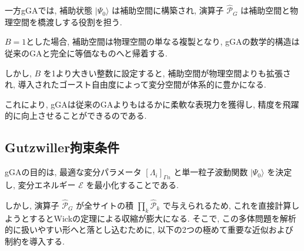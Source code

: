 一方gGAでは, 補助状態 $|\Psi_0\rangle$ は補助空間に構築され, 演算子 $\hat{\mathcal{P}}_G$ は補助空間と物理空間を橋渡しする役割を担う. 

$B=1$とした場合, 補助空間は物理空間の単なる複製となり, gGAの数学的構造は従来のGAと完全に等価なものへと帰着する. 

しかし, $B$ を1より大きい整数に設定すると, 補助空間が物理空間よりも拡張され, 導入されたゴースト自由度によって変分空間が体系的に豊かになる.

これにより, gGAは従来のGAよりもはるかに柔軟な表現力を獲得し, 精度を飛躍的に向上させることができるのである.

\subsection{Gutzwiller拘束条件}
gGAの目的は, 最適な変分パラメータ $[\Lambda_i]_{\Gamma n}$ と単一粒子波動関数 $|\Psi_0\rangle$ を決定し, 変分エネルギー $\mathcal{E} $ を最小化することである. 

しかし, 演算子 $\hat{\mathcal{P}}_G$ が全サイトの積 $\prod_k \hat{\mathcal{P}}_k$ で与えられるため, これを直接計算しようとするとWickの定理による収縮が膨大になる.
そこで, この多体問題を解析的に扱いやすい形へと落とし込むために, 以下の2つの極めて重要な近似および制約を導入する. 

